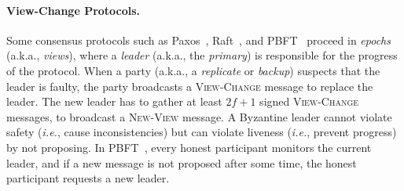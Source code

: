 \documentclass[11pt]{article}
\newcommand{\ie}{\textit{i.e.}}
\theoremstyle{mytheoremstyle}
\begin{document}
\paragraph{View-Change Protocols.} Some consensus protocols such as Paxos~\cite{lamport:1998:Paxos}, Raft~\cite{raft:2014}, and PBFT~\cite{pbft:99} proceed in \emph{epochs} (a.k.a., \emph{views}), where a \emph{leader} (a.k.a., the \emph{primary}) is responsible for the progress of the protocol. When a party (a.k.a., a \emph{replicate} or \emph{backup}) suspects that the leader is faulty, the party broadcasts a \textsc{View-Change} message to replace the leader. The new leader has to gather at least $2f+1$ signed \textsc{View-Change} messages, to broadcast a \textsc{New-View} message. A Byzantine leader cannot violate safety (\ie, cause inconsistencies) but can violate liveness (\ie, prevent progress) by not proposing. In PBFT~\cite{pbft:99}, every honest participant monitors the current leader, and if a new message is not proposed after some time, the honest participant requests a new leader.




\end{document}
